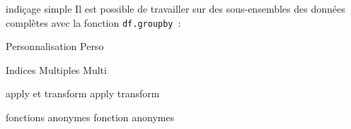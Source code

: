 \begin{frame}{indiçage simple}
  Il est possible de travailler sur des sous-ensembles des données complètes avec la fonction \texttt{df.groupby}~:
\end{frame}

\begin{frame}{Personnalisation}
  Perso
\end{frame}

\begin{frame}{Indices Multiples}
  Multi
\end{frame}

\begin{frame}{apply et transform}
  apply transform
\end{frame}

\begin{frame}{fonctions anonymes}
  fonction anonymes
\end{frame}
